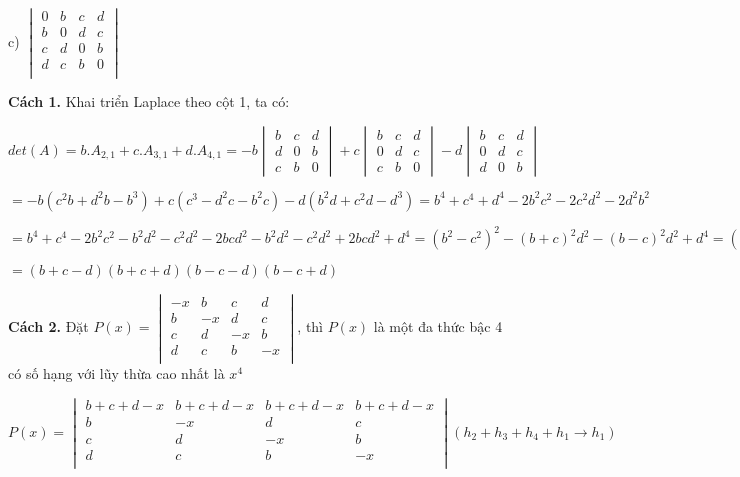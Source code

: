 \documentclass[12pt]{report}
\begin{document}
c) $\begin{vmatrix}
0 & b & c & d \\
b & 0 & d & c \\
c & d & 0 & b \\
d & c & b & 0 \\
\end{vmatrix}$

\textbf{Cách 1.} Khai triển Laplace theo cột 1, ta có:

$det(A) = b.A_{2,1} + c.A_{3,1} + d.A_{4,1} = -b\begin{vmatrix}
b & c & d \\
d & 0 & b \\
c & b & 0
\end{vmatrix} + c\begin{vmatrix}
b & c & d \\
0 & d & c \\
c & b & 0
\end{vmatrix} - d\begin{vmatrix}
b & c & d \\
0 & d & c \\
d & 0 & b
\end{vmatrix}$

$= -b\left(c^2b+d^2b-b^3\right) + c\left(c^3-d^2c-b^2c\right) -d\left(b^2d+c^2d-d^3\right) = b^4+c^4+d^4-2b^2c^2-2c^2d^2-2d^2b^2$	

$= b^4+c^4-2b^2c^2-b^2d^2-c^2d^2-2bcd^2-b^2d^2-c^2d^2+2bcd^2+d^4 = \left(b^2-c^2\right)^2-\left(b+c\right)^2d^2-\left(b-c\right)^2d^2+d^4 = \left(b^2-c^2\right)^2d^2 - \left(b^2+c^2\right)^2d^2 - (b-c)^2d^2+d^4 = \lbrack (b+c)^2-d^2 \rbrack \lbrack (b-c)^2-d^2 \rbrack$

$= (b+c-d)(b+c+d)(b-c-d)(b-c+d)$

\textbf{Cách 2.} Đặt $P(x) = \begin{vmatrix}
-x & b & c & d \\
b & -x & d & c \\
c & d & -x & b \\
d & c & b & -x \\
\end{vmatrix}$, thì $P(x)$ là một đa thức bậc 4 có số hạng với lũy thừa cao nhất là $x^4$

$P(x) = \begin{vmatrix}
b+c+d-x & b+c+d-x & b+c+d-x & b+c+d-x \\
b & -x & d & c \\
c & d & -x & b \\
d & c & b & -x \\
\end{vmatrix} (h_2+h_3+h_4+h_1 \to h_1)$
\end{document}

